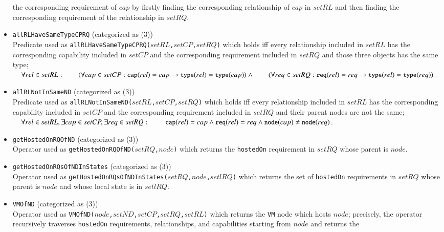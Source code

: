 \documentclass[12pt]{report}
\newcommand{\ra}{\rightarrow}
\newcommand{\mbstt}[1]{\mbox{\small{\tt {#1}}}}
\newcommand{\stt}[1]{{\small{\tt {#1}}}}
\begin{document}
\begin{itemize}
 the corresponding requirement of $cap$ by firstly finding the
 corresponding relationship of $cap$ in $setRL$ and then finding the
 corresponding requirement of the relationship in $setRQ$.
\item \stt{allRLHaveSameTypeCPRQ} (categorized as (3))\\ 
  Predicate used as
  \stt{allRLHaveSameTypeCPRQ($setRL$,$setCP$,$setRQ$)} which holds iff
  every relationship included in $setRL$ has the corresponding
  capability included in $setCP$ and the corresponding requirement
  included in $setRQ$ and those three objects has the same type;\\ 
  $~~~~\forall rel\in setRL:\\
  ~~~~~~~~(\forall cap\in setCP:\mbstt{cap}(rel)=cap\ra\mbstt{type}(rel)=\mbstt{type}(cap))\land\\
  ~~~~~~~~(\forall req\in setRQ:\mbstt{req}(rel)=req\ra\mbstt{type}(rel)=\mbstt{type}(req))$.
\item \stt{allRLNotInSameND} (categorized as (3))\\ 
  Predicate used as
  \stt{allRLNotInSameND($setRL$,$setCP$,$setRQ$)} which holds iff
  every relationship included in $setRL$ has the corresponding
  capability included in $setCP$ and the corresponding requirement
  included in $setRQ$ and their parent nodes are not the same;\\ 
  $~~~~\forall rel\in setRL, \exists cap\in setCP, \exists req\in setRQ:\\
  ~~~~~~~~~\mbstt{cap}(rel)=cap\land\mbstt{req}(rel)=req\land
  \mbstt{node}(cap)\ne\mbstt{node}(req)$.
\item \stt{getHostedOnRQOfND} (categorized as (3))\\
 Operator used as \stt{getHostedOnRQOfND($setRQ$,$node$)} which returns
 the {\tt hostedOn} requirement in $setRQ$ whose parent is $node$.
\item \stt{getHostedOnRQsOfNDInStates} (categorized as (3))\\
 Operator used as
 \stt{getHostedOnRQsOfNDInStates($setRQ$,$node$,$setlRQ$)} which
 returns the set of {\tt hostedOn} requirements in $setRQ$ whose
 parent is $node$ and whose local state is in $setlRQ$.
\item \stt{VMOfND} (categorized as (3))\\
 Operator used as \stt{VMOfND($node$,$setND$,$setCP$,$setRQ$,$setRL$)}
 which returns the {\tt VM} node which hosts $node$; precisely, the
 operator recursively traverses {\tt hostedOn} requirements,
 relationships, and capabilities starting from $node$ and returns the

\end{itemize}
\end{document}
